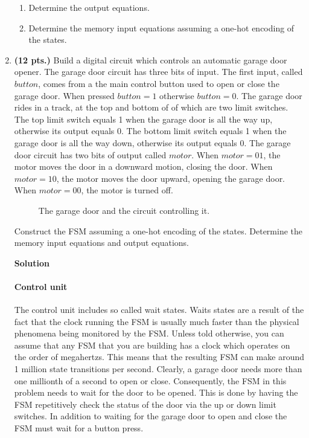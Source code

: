 \begin{enumerate}
\begin{enumerate}
\item Determine the output equations.
\item Determine the memory input equations assuming a one-hot
encoding of the states.
\end{enumerate}


\item \textbf{ (12 pts.)}
Build a digital circuit which controls an automatic garage door opener.  
The garage door circuit has three bits of input.  The first input, called 
$button$, comes from a the main control button used to open or close the 
garage door.  When pressed $button=1$ otherwise $button=0$.  The garage 
door rides in a track, at the top and bottom of of which are two 
limit switches.  The top limit switch equals 1 when the garage door 
is all the way up, otherwise its output equals 0.  The bottom limit 
switch equals 1 when the garage door is all the way down, otherwise 
its output equals 0.  The garage door circuit has two bits of output 
called $motor$.  When $motor=01$, the motor moves the door in a downward 
motion, closing the door.  When $motor=10$, the motor moves the door 
upward, opening the garage door.  When $motor=00$, the motor is turned off.

\begin{figure}[ht]
\caption{The garage door and the circuit controlling it.}
\label{fig:hwgarage}
\end{figure}

Construct the FSM assuming a one-hot encoding of the states.
Determine the memory input equations and output equations.


\begin{onlysolution}  \textbf{Solution} \itshape{

\paragraph{Control unit}
The control unit includes so called wait states.  Waits states are
a result of the fact that the clock running the FSM is usually 
much faster than the physical phenomena being monitored by the FSM.
Unless told otherwise, you can assume that any FSM that you are 
building has a clock which operates on the order of megahertzs.
This means that the resulting FSM can make around 1 million 
state transitions per second.  Clearly, a garage door needs more
than one millionth of a second to open or close.  Consequently, 
the FSM in this problem needs to wait for the door to be opened.
This is done by having the FSM repetitively check the status of the
door via the up or down limit switches.  In addition to waiting 
for the garage door to open and close the FSM must wait for a 
button press.

}
\end{onlysolution}
\end{enumerate}
